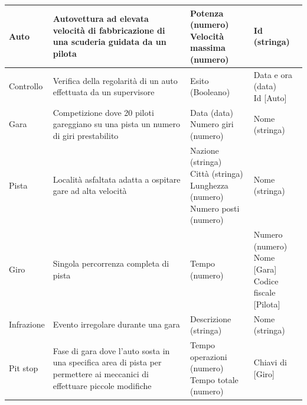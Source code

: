 \documentclass[11pt]{article}
\begin{document}
\begin{center}
{\begin{tabular}{ |l|p{5.5cm}|p{5cm}|p{4cm}| }
        \hline
        Auto &
        Autovettura ad elevata velocità di fabbricazione di una scuderia guidata da un pilota &
        \parbox[t]{\linewidth}{Potenza (numero)\\Velocità massima (numero)} & 
        Id (stringa) \\

        \hline
        Controllo &
        Verifica della regolarità di un auto effettuata da un supervisore & 
        \parbox[t]{\linewidth}{Esito (Booleano)} & 
        \parbox[t]{\linewidth}{Data e ora (data)\\Id [Auto] } \\

        \hline
        Gara &
        Competizione dove 20 piloti gareggiano su una pista un numero di giri prestabilito & 
        \parbox[t]{\linewidth}{Data (data)\\Numero giri (numero)} & 
        Nome (stringa) \\

        \hline
        Pista &
        Località asfaltata adatta a ospitare gare ad alta velocità & 
        \parbox[t]{\linewidth}{Nazione (stringa)\\Città (stringa)\\Lunghezza (numero)\\Numero posti (numero)} & 
        Nome (stringa) \\

        \hline
        Giro &
        Singola percorrenza completa di pista & 
        \parbox[t]{\linewidth}{Tempo (numero)} & 
        \parbox[t]{\linewidth}{Numero (numero)\\Nome [Gara]\\Codice fiscale [Pilota]} \\ 

        \hline
        Infrazione &
        Evento irregolare durante una gara & 
        \parbox[t]{\linewidth}{Descrizione (stringa)} & 
        Nome (stringa) \\

        \hline
        Pit stop &
        Fase di gara dove l'auto sosta in una specifica area di pista per permettere ai meccanici di effettuare piccole modifiche & 
        \parbox[t]{\linewidth}{Tempo operazioni (numero)\\Tempo totale (numero)} & 
        Chiavi di [Giro] \\

        \hline
    \end{tabular}
}
\end{center}
\end{document}
